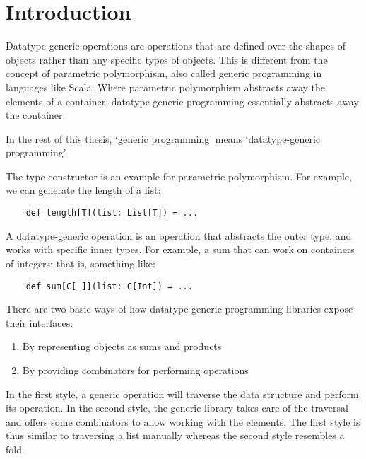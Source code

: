 \chapter{Introduction}
Datatype-generic operations are operations that are defined over the shapes
of objects rather than any specific types of objects. This is different from
the concept of parametric polymorphism, also called generic programming in
languages like Scala:
Where parametric polymorphism abstracts away the elements of a container,
datatype-generic programming essentially abstracts away the container.

In the rest of this thesis, `generic programming' means `datatype-generic
programming'.


\begin{example}
The type constructor  is an example for parametric polymorphism. For
example, we can generate the length of a list:

\begin{lstlisting}
    def length[T](list: List[T]) = ...
\end{lstlisting}
\end{example}

\begin{example}
A datatype-generic operation is an operation that abstracts the outer type, and
works with specific inner types. For example, a sum that can work on containers
of integers; that is, something like:
\begin{lstlisting}
    def sum[C[_]](list: C[Int]) = ...
\end{lstlisting}
\end{example}

There are two basic ways of how datatype-generic programming libraries expose
their interfaces:

\begin{enumerate}
    \item By representing objects as sums and products
    \item By providing combinators for performing operations
\end{enumerate}

In the first style, a generic operation will traverse the data structure and
perform its operation. In the second style, the generic library takes care of
the traversal and offers some combinators to allow working with the elements.
The first style is thus similar to traversing a list manually whereas
the second style resembles a fold.

